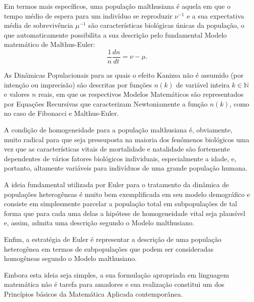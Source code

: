 Em termos mais específicos, uma população malthusiana é aquela em que o tempo médio de espera para um indivíduo se reproduzir \(\nu^{-1}\) e a sua expectativa média de sobrevivência \(\mu^{-1}\) são características biológicas únicas da população, o que automaticamente possibilita a sua descrição pelo fundamental Modelo matemático de Malthus-Euler:
\begin{equation}\label{eq:Malthus-Euler}
\dfrac{1}{n}\dfrac{dn}{dt} = \nu-\mu.
\end{equation}


As Dinâmicas Populacionais para as quais o efeito Kanizsa não é assumido (por intenção ou imprecisão) são descritas por funções \(n(k)\) de variável inteira \(k \in \mathbb{N}\) e valores \(n\) reais, em que os respectivos Modelos Matemáticos são representados por Equações Recursivas que caracterizam Newtoniamente a função \(n(k)\), como no caso de Fibonacci e Malthus-Euler.


A condição de homogeneidade para a população malthusiana é, obviamente, muito radical para que seja pressuposta na maioria dos fenômenos biológicos uma vez que as características vitais de mortalidade e natalidade são fortemente dependentes de vários fatores biológicos individuais, especialmente a idade, e, portanto, altamente variáveis para indivíduos de uma grande população humana.

A ideia fundamental utilizada por Euler para o tratamento da dinâmica de populações heterogêneas é muito bem exemplificada em seu modelo demográfico e consiste em simplesmente parcelar a população total em subpopulações de tal forma que para cada uma delas a hipótese de homogeneidade vital seja plausível e, assim, admita uma descrição segundo o Modelo malthusiano.

Enfim, a estratégia de Euler é representar a descrição de uma população heterogênea em termos de subpopulações que podem ser consideradas homogêneas segundo o Modelo malthusiano.

Embora esta ideia seja simples, a sua formulação apropriada em linguagem matemática não é tarefa para amadores e sua realização constitui um dos Princípios básicos da Matemática Aplicada contemporânea. 

